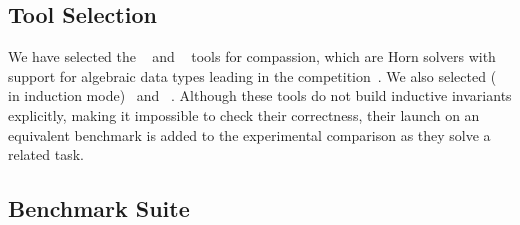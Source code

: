 \subsection{Tool Selection}
We have selected the \racer{}~\cite{10.1145/3498722} and \eldarica{}~\cite{8603013} tools for compassion, which are Horn solvers with support for algebraic data types leading in the \chccomp{} competition~\cite{De_Angelis_2022}. We also selected \cvcind{} (\cvc{} in induction mode)~\cite{reynolds2015induction} and \vericat{}~\cite{10.1093/logcom/exab090}. Although these tools do not build inductive invariants explicitly, making it impossible to check their correctness, their launch on an equivalent benchmark is added to the experimental comparison as they solve a related task.



\subsection{Benchmark Suite}

